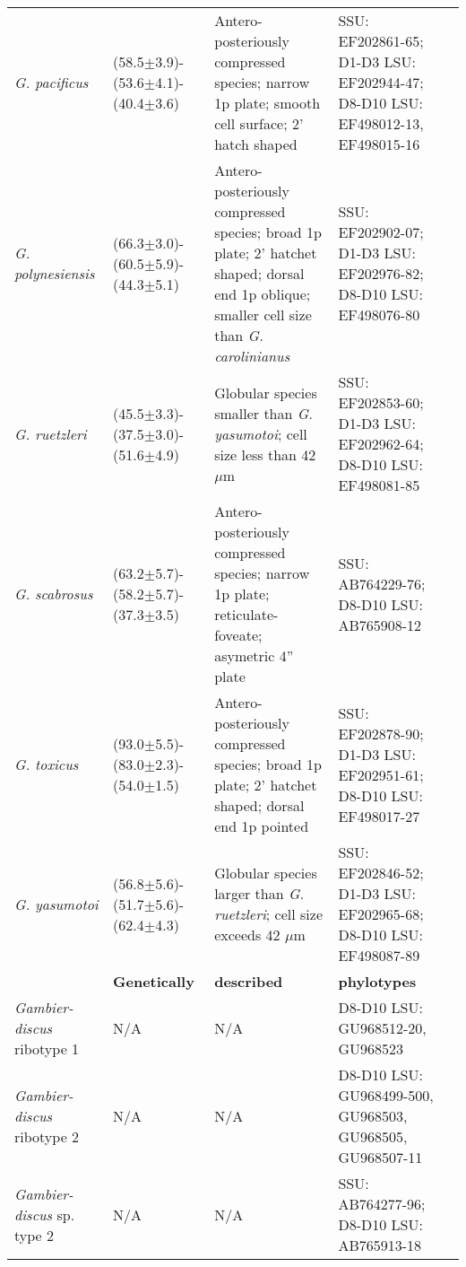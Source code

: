 \documentclass[12pt]{article}
\begin{document}
\begin{longtable}{  p{2cm}  p{2.7cm}  p{4.5cm}  p{3.1cm}  p{1cm}  }
  \emph{G. pacificus} & (58.5$\pm$3.9)-(53.6$\pm$4.1)-(40.4$\pm$3.6) & Antero-posteriously compressed species; narrow 1p plate; smooth cell surface; 2' hatch shaped & SSU: EF202861-65; D1-D3 LSU: EF202944-47; D8-D10 LSU: EF498012-13, EF498015-16  & \cite{litaker2009taxonomy,chinain1999morphology} \\
 \emph{G. polynesiensis} & (66.3$\pm$3.0)-(60.5$\pm$5.9)-(44.3$\pm$5.1) & Antero-posteriously compressed species; broad 1p plate; 2’ hatchet shaped; dorsal end 1p oblique; smaller cell size than \emph{G. carolinianus} & SSU: EF202902-07; D1-D3 LSU: EF202976-82; D8-D10 LSU: EF498076-80  & \cite{litaker2009taxonomy,chinain1999morphology} \\
 \emph{G. ruetzleri} & (45.5$\pm$3.3)-(37.5$\pm$3.0)-(51.6$\pm$4.9) & Globular species smaller than \emph{G. yasumotoi}; cell size less than 42$\mu$m & SSU: EF202853-60; D1-D3 LSU: EF202962-64; D8-D10 LSU: EF498081-85 & \cite{litaker2009taxonomy} \\
 \emph{G. scabrosus} & (63.2$\pm$5.7)-(58.2$\pm$5.7)-(37.3$\pm$3.5) & Antero-posteriously compressed species; narrow 1p plate; reticulate-foveate; asymetric 4'' plate & SSU: AB764229-76; D8-D10 LSU: AB765908-12  & \cite{nishimura2013genetic,nishimura2014morphology,kuno2010genetic} \\ %
 \emph{G. toxicus} & (93.0$\pm$5.5)-(83.0$\pm$2.3)-(54.0$\pm$1.5) & Antero-posteriously compressed species; broad 1p plate; 2’ hatchet shaped; dorsal end 1p pointed & SSU: EF202878-90; D1-D3 LSU: EF202951-61; D8-D10 LSU: EF498017-27 & \cite{litaker2009taxonomy,adachi1979thecal,chinain1997intraspecific,richlen2008phylogeography} \\
  \emph{G. yasumotoi} & (56.8$\pm$5.6)-(51.7$\pm$5.6)-(62.4$\pm$4.3) & Globular species larger than \emph{G. ruetzleri}; cell size exceeds 42 $\mu$m & SSU: EF202846-52; D1-D3 LSU: EF202965-68; D8-D10 LSU: EF498087-89 & \cite{holmes1998gambierdiscus,litaker2009taxonomy} \\
  \hline
    & \textbf{Genetically} & \textbf{described} & \textbf{phylotypes} & \\
 \emph{Gambier- discus} ribotype 1 & N/A & N/A  & D8-D10 LSU: GU968512-20, GU968523 & \cite{litaker2010global} \\
 \emph{Gambier- discus} ribotype 2 & N/A & N/A & D8-D10 LSU: GU968499-500, GU968503, GU968505, GU968507-11  & \cite{litaker2010global} \\
 \emph{Gambier- discus} sp. type 2 & N/A & N/A & SSU: AB764277-96; D8-D10 LSU: AB765913-18 & \cite{kuno2010genetic,nishimura2013genetic} \\

\end{longtable}
\end{document}
